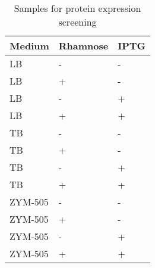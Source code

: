 \begin{table}
	\centering
	\begin{tabu}{lll}
		\toprule
		Medium & Rhamnose & IPTG \\
		\midrule
		LB & - & - \\
		LB & + & - \\
		LB & - & + \\
		LB & + & + \\

		TB & - & - \\
		TB & + & - \\
		TB & - & + \\
		TB & + & + \\

		ZYM-505 & - & - \\
		ZYM-505 & + & - \\
		ZYM-505 & - & + \\
		ZYM-505 & + & + \\
		\bottomrule
	\end{tabu}
	\caption{Samples for protein expression screening}
	\label{tbl:expression_samples}
\end{table}
